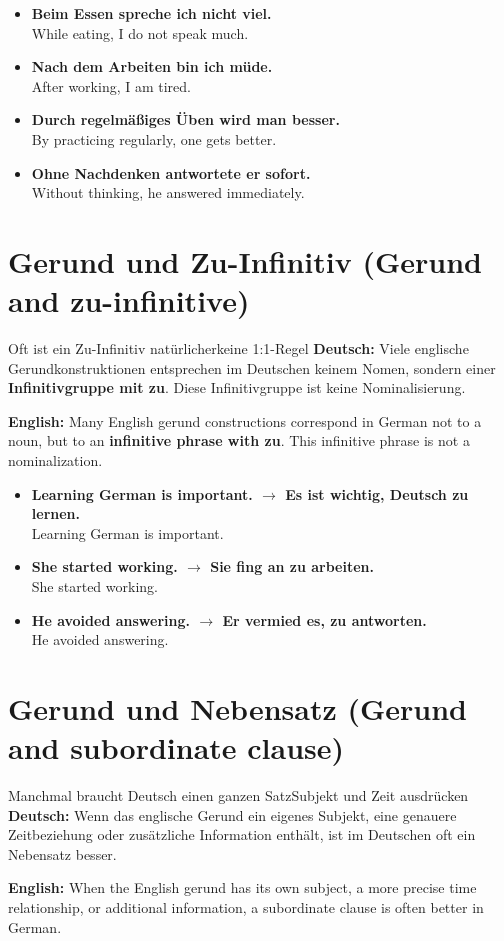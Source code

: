 \documentclass[a4paper,11pt]{article}
\newcommand{\GermanText}[1]{\textbf{Deutsch: }#1\par}
\newcommand{\EnglishText}[1]{{\small\color{SoftGray}\textbf{English: }#1\par}}
\newcommand{\ExampleItem}[2]{\item \textbf{#1}\\{\small\color{SoftGray}#2}}
\begin{document}
\begin{exbox}
\begin{itemize}
\ExampleItem{Beim Essen spreche ich nicht viel.}{While eating, I do not speak much.}
\ExampleItem{Nach dem Arbeiten bin ich müde.}{After working, I am tired.}
\ExampleItem{Durch regelmäßiges Üben wird man besser.}{By practicing regularly, one gets better.}
\ExampleItem{Ohne Nachdenken antwortete er sofort.}{Without thinking, he answered immediately.}
\end{itemize}
\end{exbox}

\section{Gerund und Zu-Infinitiv \textnormal{(Gerund and zu-infinitive)}}
\begin{grammarentry}{Oft ist ein Zu-Infinitiv natürlicher}{keine 1:1-Regel}
\GermanText{Viele englische Gerundkonstruktionen entsprechen im Deutschen keinem Nomen, sondern einer \textbf{Infinitivgruppe mit zu}. Diese Infinitivgruppe ist keine Nominalisierung.}
\EnglishText{Many English gerund constructions correspond in German not to a noun, but to an \textbf{infinitive phrase with zu}. This infinitive phrase is not a nominalization.}
\end{grammarentry}

\begin{exbox}
\begin{itemize}
\ExampleItem{Learning German is important. $\rightarrow$ Es ist wichtig, Deutsch zu lernen.}{Learning German is important.}
\ExampleItem{She started working. $\rightarrow$ Sie fing an zu arbeiten.}{She started working.}
\ExampleItem{He avoided answering. $\rightarrow$ Er vermied es, zu antworten.}{He avoided answering.}
\end{itemize}
\end{exbox}

\section{Gerund und Nebensatz \textnormal{(Gerund and subordinate clause)}}
\begin{grammarentry}{Manchmal braucht Deutsch einen ganzen Satz}{Subjekt und Zeit ausdrücken}
\GermanText{Wenn das englische Gerund ein eigenes Subjekt, eine genauere Zeitbeziehung oder zusätzliche Information enthält, ist im Deutschen oft ein Nebensatz besser.}
\EnglishText{When the English gerund has its own subject, a more precise time relationship, or additional information, a subordinate clause is often better in German.}
\end{grammarentry}
\end{document}
